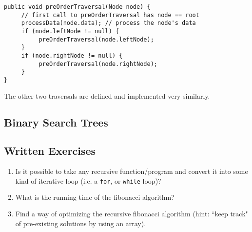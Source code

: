 \begin{lstlisting}
public void preOrderTraversal(Node node) {
     // first call to preOrderTraversal has node == root
     processData(node.data); // process the node's data
     if (node.leftNode != null) {
          preOrderTraversal(node.leftNode);
     }
     if (node.rightNode != null) {
          preOrderTraversal(node.rightNode);
     }
}
\end{lstlisting}
The other two traversals are defined and implemented very similarly.

\subsection*{Binary Search Trees}


\subsection{Written Exercises}
\setcounter{counter}{1}
\begin{enumerate}[label={\arabic{counter}\addtocounter{counter}{1}}.]
\item Is it possible to take any recursive function/program and convert it into some kind of iterative loop (i.e. a \verb|for|, or \verb|while| loop)?
\item What is the running time of the fibonacci algorithm?
\item Find a way of optimizing the recursive fibonacci algorithm (hint: ``keep track" of pre-existing solutions by using an array).
\end{enumerate}